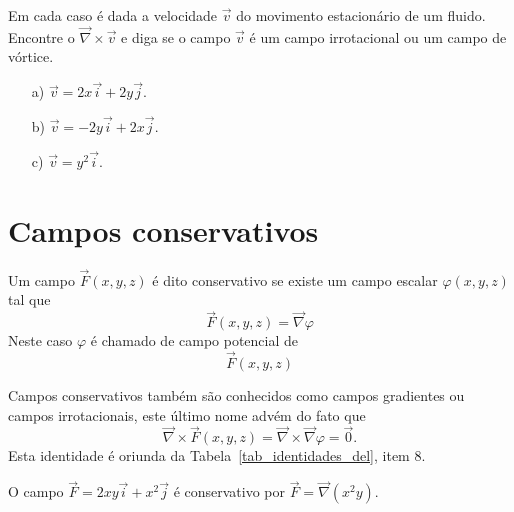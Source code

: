 \begin{exer}
Em cada caso é dada a velocidade $\vec{v}$ do movimento estacionário de um fluido. Encontre o $\vec{\nabla}\times\vec{v}$ e diga se o campo $\vec{v}$ é um campo irrotacional ou um campo de vórtice.
\begin{itemize}
 \item[a)] $\vec{v}=2x\vec{i}+2y\vec{j}$.
 \item[b)] $\vec{v}=-2y\vec{i}+2x\vec{j}$.
 \item[c)] $\vec{v}=y^2\vec{i}$.
 \end{itemize}

\end{exer}




\section{Campos conservativos}
\begin{defn} \label{def_campo_conservativo}  Um campo $\vec{F}(x,y,z)$ é dito conservativo se existe um campo escalar $\varphi(x,y,z)$ tal que
$$\vec{F}(x,y,z) = \vec{\nabla}\varphi$$
Neste caso $\varphi$ é chamado de campo potencial de $$\vec{F}(x,y,z)$$
\end{defn}
\begin{obs} Campos conservativos também são conhecidos como campos gradientes ou campos irrotacionais, este último nome advém do fato que $$\vec{\nabla}\times\vec{F}(x,y,z) = \vec{\nabla}\times\vec{\nabla}\varphi=\vec{0}.$$
Esta identidade é oriunda da Tabela~\ref{tab_identidades_del}, item 8.
 \end{obs}
\begin{ex} O campo $\vec{F}=2xy\vec{i}+x^2\vec{j}$ é conservativo por $\vec{F}=\vec{\nabla}\left(x^2y\right)$.
 \end{ex}

